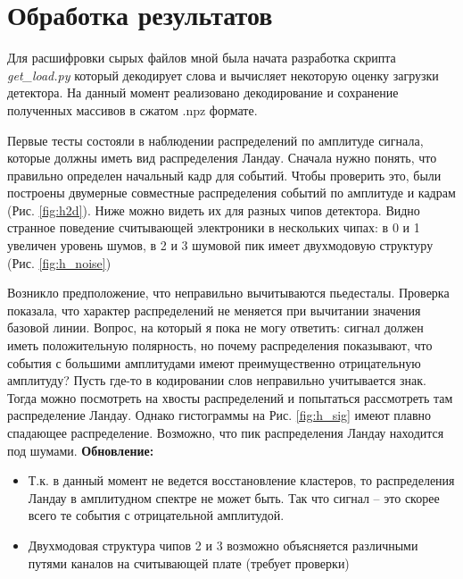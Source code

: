 \documentclass[12pt]{article}
\begin{document}
\section{Обработка результатов}
Для расшифровки сырых файлов мной была начата разработка скрипта \textit{get\_load.py} который  декодирует слова и вычисляет некоторую оценку загрузки детектора. На данный момент реализовано декодирование и сохранение полученных массивов в сжатом .npz формате. \par
Первые тесты состояли в наблюдении распределений по амплитуде сигнала, которые должны иметь вид распределения Ландау. Сначала нужно понять, что правильно определен начальный кадр для событий. Чтобы проверить это, были построены двумерные совместные распределения событий по амплитуде и кадрам (Рис. \ref{fig:h2d}). Ниже можно видеть их для разных чипов детектора. Видно странное поведение считывающей электроники в нескольких чипах: в 0 и 1 увеличен уровень шумов, в 2 и 3 шумовой пик имеет двухмодовую структуру (Рис. \ref{fig:h_noise}) \par
Возникло предположение, что неправильно вычитываются пьедесталы. Проверка показала, что характер распределений не меняется при вычитании значения базовой линии. Вопрос, на который я пока не могу ответить: сигнал должен иметь положительную полярность, но почему распределения показывают, что события с большими амплитудами имеют преимущественно отрицательную амплитуду? Пусть где-то в кодировании слов неправильно учитывается знак. Тогда можно посмотреть на хвосты распределений и попытаться рассмотреть там распределение Ландау. Однако гистограммы на Рис. \ref{fig:h_sig} имеют плавно спадающее распределение. Возможно, что пик распределения Ландау находится под шумами. 
\newpage
\textbf{Обновление:} 
\begin{itemize}
	\item Т.к. в данный момент не ведется восстановление кластеров, то распределения Ландау в амплитудном спектре не может быть. Так что сигнал -- это скорее всего те события с отрицательной амплитудой.
	\item Двухмодовая структура чипов 2 и 3 возможно объясняется различными путями каналов на считывающей плате (требует проверки)
\end{itemize}
\end{document}
